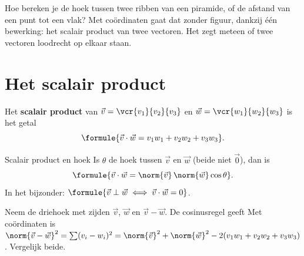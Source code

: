 %



Hoe bereken je de hoek tussen twee ribben van een piramide, of de afstand van een punt tot een vlak? Met coördinaten gaat dat zonder figuur, dankzij één bewerking: het scalair product van twee vectoren. Het zegt meteen of twee vectoren loodrecht op elkaar staan.

\begin{oefeningen}[Start]

\end{oefeningen}

\section{Het scalair product}

\begin{theorie}
Het \textbf{\textcolor{accent}{scalair product}} van $\vec v = \vcr{v_1}{v_2}{v_3}$ en $\vec w = \vcr{w_1}{w_2}{w_3}$ is het getal
\[\formule{\vec v \cdot \vec w = v_1w_1 + v_2w_2 + v_3w_3}.\]
\begin{stelling}{Scalair product en hoek}
Is $\theta$ de hoek tussen $\vec v$ en $\vec w$ (beide niet $\vec 0$), dan is
\[\formule{\vec v \cdot \vec w = \norm{\vec v}\,\norm{\vec w}\cos\theta}.\]
In het bijzonder: $\formule{\vec v \perp \vec w \iff \vec v \cdot \vec w = 0}$.
\end{stelling}
\begin{bewijs}
Neem de driehoek met zijden $\vec v$, $\vec w$ en $\vec v - \vec w$. De cosinusregel geeft
Met coördinaten is $\norm{\vec v - \vec w}^2 = \sum (v_i - w_i)^2 = \norm{\vec v}^2 + \norm{\vec w}^2 - 2(v_1w_1 + v_2w_2 + v_3w_3)$. Vergelijk beide.
\end{bewijs}
\end{theorie}


